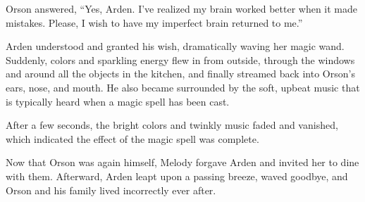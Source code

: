 Orson answered, “Yes, Arden. I've realized my brain worked better when it made mistakes. Please, I wish to have my imperfect brain returned to me.”

Arden understood and granted his wish, dramatically waving her magic wand. Suddenly, colors and sparkling energy flew in from outside, through the windows and around all the objects in the kitchen, and finally streamed back into Orson's ears, nose, and mouth. He also became surrounded by the soft, upbeat music that is typically heard when a magic spell has been cast.

After a few seconds, the bright colors and twinkly music faded and vanished, which indicated the effect of the magic spell was complete.

Now that Orson was again himself, Melody forgave Arden and invited her to dine with them. Afterward, Arden leapt upon a passing breeze, waved goodbye, and Orson and his family lived incorrectly ever after.